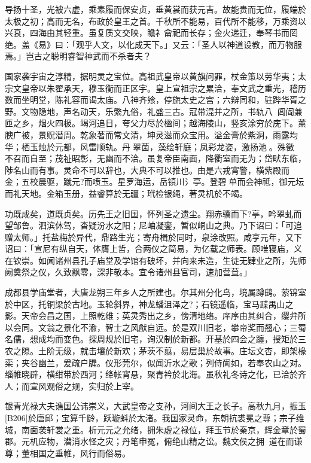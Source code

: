 \documentclass[UTF8,titlepage,oneside]{ctexbook}
\begin{document}
导扬十圣，光被六虚，乘素履而保安贞，垂黄裳而获元吉。故能贵而无位，履端於太极之初；高而无名，布政於皇王之首。千秋所不能易，百代所不能移，万乘资以兴衰，四海由其轻重。虽复质文交映，瞻礻龠祀而长存；金火递迁，奉琴书而罔绝。盖《易》曰：「观乎人文，以化成天下。」又云：「圣人以神道设教，而万物服焉。」岂古之聪明睿智神武而不杀者夫？


国家袭宇宙之淳精，据明灵之宝位。高祖武皇帝以黄旗问罪，杖金策以劳华夷；太宗文皇帝以朱翟承天，穆玉衡而正区宇。皇上宣祖宗之累洽，奉文武之重光，稽历数而坐明堂，陈礼容而谒太庙。八神齐飨，停旒太史之宫；六辩同和，驻跸华胥之野。文物隐地，声名动天，乐繁九俗，礼盛三古。冠带混并之所，书轨八；闾阎兼匝之乡，烟火四极。竭河追日，夸父力尽於楹间；越海陵山，竖亥涂穷於庑下。薰腴广被，景贶潜周。乾象著而常文清，坤灵滋而众宝用。溢金膏於紫洞，雨露均华；栖玉烛於元都，风雷顺轨。丹翠菌，藻绘轩庭；凤彩龙姿，激扬池。殊徵，不召而自至；茂祉昭彰，无幽而不洽。虽复帝臣南面，降衢室而无为；岱畎东临，陟名山而有事。灵命不可以辞也，大典不可以推也。由是六戎宵警，横紫殿而金；五校晨驱，蹴元?而喷玉。星罗海运，岳镇川氵亭。登碧单而会神祗，御元坛而礼天地。金箱玉册，益睿算於无疆；玳检银绳，著灵机於不竭。


功既成矣，道既贞矣。历先王之旧国，怀列圣之遗尘。翔赤骥而下?亭，吟翠虬而望邹鲁。泗滨休驾，杳疑汾水之阳；尼岫凝銮，暂似峒山之典。乃下诏曰：「可追赠太师。」托盐梅於异代，鼎路生光；寄舟楫於同时，泉涂改照。咸亨元年，又下诏曰：「宣尼有纵自天，体膺上哲，合两仪之简易，为亿载之师表。顾唯寝庙，义在钦崇。如闻诸州县孔子庙堂及学馆有破坏，并向来未造，生徒无肄业之所，先师阙奠祭之仪，久致飘零，深非敬本。宜令诸州县官司，速加营葺。」


成都县学庙堂者，大唐龙朔三年乡人之所建也。尔其州分化鸟，境属蹲鸱。萦锦室於中区，托铜梁於古地。玉轮斜界，神龙蟠沮泽之?；石镜遥临，宝马蹀禺山之影。天帝会昌之国，上照乾维；英灵秀出之乡，傍清地络。庠序由其纠合，缨弁所以会同。文翁之景化不渝，智士之风猷自远。於是双川旧老，攀帝奖而翘心；三蜀名儒，想成均而变色。探周规於旧宅，询汉制於新都。开基於四会之躔，授矩於三农之隙。土阶无级，就击壤於新欢；茅茨不翦，易层巢於故事。庄坛文杏，即架椽栾；夹谷幽兰，爰疏户牖。仪形莞尔，似闻沂水之歌；列侍訚如，若奉农山之对。缁帷晓辟，横绀带於西河；绛帐宵悬，聚青衿於北海。虽秋礼冬诗之化，已洽於齐人；而宣风观俗之规，实归於上宰。


银青光禄大夫谯国公讳崇义，大武皇帝之支孙，河间大王之长子。高秋九月，振玉[B206]於唐邱；宝算千龄，跃璇蚪於太渚。我国家灵命，东朝抗裘冕之尊；宗子维城，南面袭轩裳之重。析元元之允绪，拥朱虚之禄位，拜玉节於秦京，辉金章於蜀郡。元机应物，潜消水怪之灾；丹笔申冤，俯绝山精之讼。魏文侯之拥，道在而谦尊；董相国之垂帷，风行而俗易。
\end{document}
